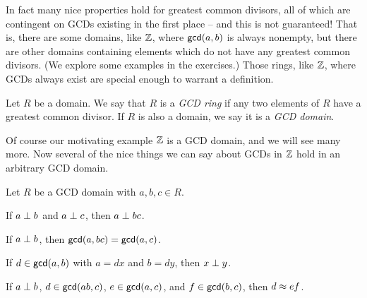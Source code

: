 In fact many nice properties hold for greatest common divisors, all of which are contingent on GCDs existing in the first place -- and this is not guaranteed! That is, there are some domains, like \(\mathbb{Z}\), where \(\mathsf{gcd}(a, b)\) is always nonempty, but there are other domains containing elements which do not have any greatest common divisors. (We explore some examples in the exercises.) Those rings, like \(\mathbb{Z}\), where GCDs always exist are special enough to warrant a definition.

\begin{dfn} \label{dfn:gcd-ring}
Let \(R\) be a domain. We say that \(R\) is a \emph{GCD ring} if any two elements of \(R\) have a greatest common divisor.  If \(R\) is also a domain, we say it is a \emph{GCD domain}. 
\end{dfn}

Of course our motivating example \(\mathbb{Z}\) is a GCD domain, and we will see many more. Now several of the nice things we can say about GCDs in \(\mathbb{Z}\) hold in an arbitrary GCD domain.

\begin{prop} \label{prop:gcd-dom-basics}
Let \(R\) be a GCD domain with \(a,b,c \in R\).
\begin{proplist*}
\item If \(a \perp b\) and \(a \perp c\), then \(a \perp bc\).
\item If \(a \perp b\), then \(\mathsf{gcd}(a, bc) = \mathsf{gcd}(a, c)\). \label{prop:gcd-dom-basics:drop-factor}
\item If \(d \in \mathsf{gcd}(a, b)\) with \(a = dx\) and \(b = dy\), then \(x \perp y\).
\item If \(a \perp b\), \(d \in \mathsf{gcd}(ab, c)\), \(e \in \mathsf{gcd}(a, c)\), and \(f \in \mathsf{gcd}(b, c)\), then \(d \approx ef\).
\end{proplist*}
\end{prop}

